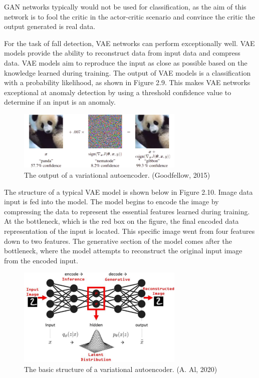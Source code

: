 GAN networks typically would not be used for classification, as the aim of this network is to fool the critic in the actor-critic scenario and convince the critic the output generated is real data.  

For the task of fall detection, VAE networks can perform exceptionally well. VAE models provide the ability to reconstruct data from input data and compress data. VAE models aim to reproduce the input as close as possible based on the knowledge learned during training. The output of VAE models is a classification with a probability likelihood, as shown in Figure 2.9. This makes VAE networks exceptional at anomaly detection by using a threshold confidence value to determine if an input is an anomaly. 

\begin{figure}[H]
    \centering
    \includegraphics[width=300px, keepaspectratio]{classifiy.png}
    \vspace{1ex}%
    \caption{The output of a variational autoencoder. (Goodfellow, 2015)}
    \label{fig:my_label}
\end{figure}

The structure of a typical VAE model is shown below in Figure 2.10. Image data input is fed into the model. The model begins to encode the image by compressing the data to represent the essential features learned during training. At the bottleneck, which is the red box on the figure, the final encoded data representation of the input is located. This specific image went from four features down to two features. The generative section of the model comes after the bottleneck, where the model attempts to reconstruct the original input image from the encoded input.

\begin{figure}[H]
    \centering
    \includegraphics[width=300px, keepaspectratio]{vae.png}
    \vspace{1ex}%
    \caption{The basic structure of a variational autoencoder. (A. Al, 2020)}
    \label{fig:my_label}
\end{figure}

